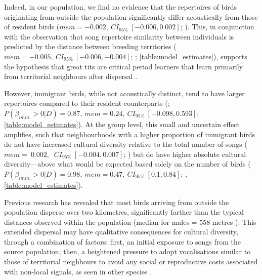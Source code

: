 \documentclass[9pt, onecolumn, twoside, lineno]{gsajnl}
\begin{document}
Indeed, in our population, we find no evidence that the repertoires of birds originating from outside the population significantly differ acoustically from those of resident birds ($mem = -0.002,~CI_{95\%}~[-0.006, 0.002]$; ). This, in conjunction with the observation that song repertoire similarity between individuals is predicted by the distance between breeding territories ($mem = -0.005,~CI_{95\%}~[-0.006, -0.004]$; ; \autoref{table:model_estimates}), supports the hypothesis that great tits are critical period learners that learn primarily from territorial neighbours after dispersal \autocite{mcgregor1982b, rivera-gutierrez2011}.

However, immigrant birds, while not acoustically distinct, tend to have larger repertoires compared to their resident counterparts (; $P(\beta_{\overline{imm}.} > 0 | D) = 0.87,~mem=0.24,~CI_{95\%}~[-0.098, 0.593]$; \autoref{table:model_estimates}). At the group level, this small and uncertain effect amplifies, such that neighbourhoods with a higher proportion of immigrant birds do not have increased cultural diversity relative to the total number of songs ($mem=~0.002,$ $~CI_{95\%}~[-0.004, 0.007]$; ) but do have higher absolute cultural diversity---above what would be expected based solely on the number of birds ($P(\beta_{\overline{imm}.} > 0 | D) = 0.98,~mem=0.47,~CI_{95\%}~[0.1, 0.84]$; , \autoref{table:model_estimates}). 

Previous research \autocite{verhulst1997}  has revealed that most birds arriving from outside the population disperse over two kilometres, significantly farther than the typical distances observed within the population (median for males = 558 metres \autocite{greenwood1979}). This extended dispersal may have qualitative consequences for cultural diversity, through a combination of factors: first, an initial exposure to songs from the source population; then, a heightened pressure to adopt vocalisations similar to those of territorial neighbours to avoid any social or reproductive costs associated with non-local signals, as seen in other species \autocite{payne1983, baker1981, mortega2014, lachlan2014, beecher2008}.
\end{document}
